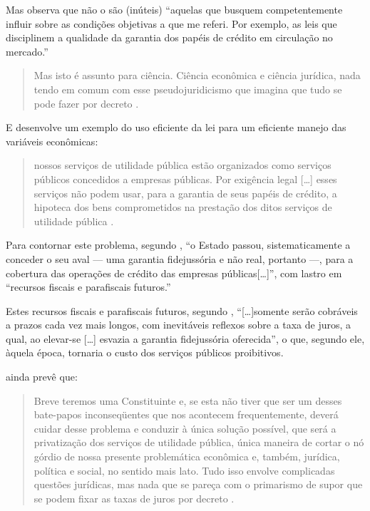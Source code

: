 \documentclass[]{article}
\begin{document}
Mas observa que não o são (inúteis) ``aquelas que busquem
competentemente influir sobre as condições objetivas a que me referi.
Por exemplo, as leis que disciplinem a qualidade da garantia dos papéis
de crédito em circulação no mercado.''

\begin{quote}
Mas isto é assunto para ciência. Ciência econômica e ciência jurídica,
nada tendo em comum com esse pseudojuridicismo que imagina que tudo se
pode fazer por decreto \cite[p.~467]{rangel1985b}.
\end{quote}

E desenvolve um exemplo do uso eficiente da lei para um eficiente manejo
das variáveis econômicas:

\begin{quote}
nossos serviços de utilidade pública estão organizados como serviços
públicos concedidos a empresas públicas. Por exigência legal
{[}\ldots{}{]} esses serviços não podem usar, para a garantia de seus
papéis de crédito, a hipoteca dos bens comprometidos na prestação dos
ditos serviços de utilidade pública \cite[p.~469]{rangel1985b}.
\end{quote}

Para contornar este problema, segundo ,
``o Estado passou, sistematicamente a conceder o seu aval --- uma
garantia fidejussória e não real, portanto ---, para a cobertura das
operações de crédito das empresas públicas{[}\ldots{}{]}'', com lastro
em ``recursos fiscais e parafiscais futuros.''

Estes recursos fiscais e parafiscais futuros, segundo
, ``{[}\ldots{}{]}somente serão
cobráveis a prazos cada vez mais longos, com inevitáveis reflexos sobre
a taxa de juros, a qual, ao elevar-se {[}\ldots{}{]} esvazia a garantia
fidejussória oferecida'', o que, segundo ele, àquela época, tornaria o
custo dos serviços públicos proibitivos.

 ainda prevê que:

\begin{quote}
Breve teremos uma Constituinte e, se esta não tiver que ser um desses
bate-papos inconseqüentes que nos acontecem frequentemente, deverá
cuidar desse problema e conduzir à única solução possível, que será a
privatização dos serviços de utilidade pública, única maneira de cortar
o nó górdio de nossa presente problemática econômica e, também,
jurídica, política e social, no sentido mais lato. Tudo isso envolve
complicadas questões jurídicas, mas nada que se pareça com o primarismo
de supor que se podem fixar as taxas de juros por decreto
\cite[p.~469]{rangel1985b}.
\end{quote}
\end{document}
